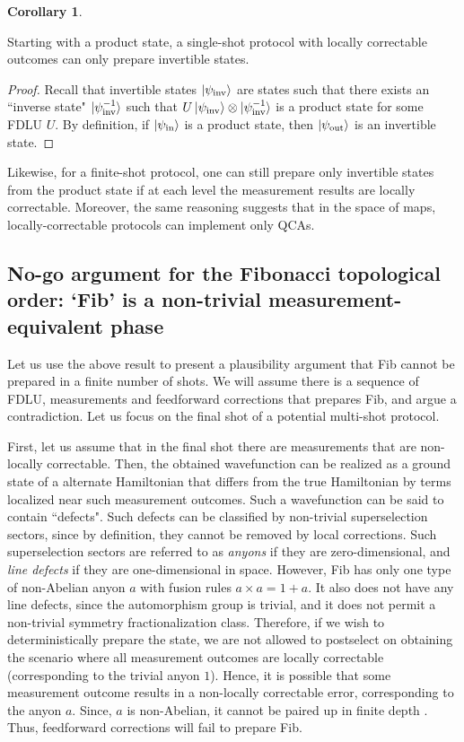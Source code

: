 \documentclass[nofootinbib,prx,twocolumn,showpacs,superscriptaddress,notitlepage,amsmath,amssymb]{revtex4-2}
\theoremstyle{definition}
\def\ket#1{\mathinner{|{#1}\rangle}}
\newtheorem{cor}[theorem]{Corollary}
\begin{document}
\begin{cor}
\begin{shaded}
Starting with a product state, a single-shot protocol with locally correctable outcomes can only prepare invertible states. 
\label{thm:cor3}
\end{shaded}
\begin{proof}
    Recall that invertible states $\ket{\psi_\text{inv}}$ are states such that there exists an ``inverse state" $\ket{\psi_\text{inv}^{-1}}$ such that $U \ket{\psi_\text{inv}} \otimes \ket{\psi_\text{inv}^{-1}} $ is a product state for some FDLU $U$. By definition, if $\ket{\psi_\text{in}}$ is a product state, then $\ket{\psi_\text{out}}$ is an invertible state.
\end{proof}
\end{cor}
Likewise, for a finite-shot protocol, one can still prepare only invertible states from the product state if at each level the measurement results are locally correctable. Moreover, the same reasoning suggests that in the space of maps, locally-correctable protocols can implement only QCAs.

\subsection{No-go argument for the Fibonacci topological order: `Fib' is a non-trivial measurement-equivalent phase}

Let us use the above result to present a plausibility argument that Fib cannot be prepared in a finite number of shots. We will assume there is a sequence of FDLU, measurements and feedforward corrections that prepares Fib, and argue a contradiction. Let us focus on the final shot of a potential multi-shot protocol.

First, let us assume that in the final shot there are measurements that are non-locally correctable. Then, the obtained wavefunction can be realized as a ground state of a alternate Hamiltonian that differs from the true Hamiltonian by terms localized near such measurement outcomes. Such a wavefunction can be said to contain ``defects". Such defects can be classified by non-trivial superselection sectors, since by definition, they cannot be removed by local corrections. Such superselection sectors are referred to as \textit{anyons} if they are zero-dimensional, and \textit{line defects} if they are one-dimensional in space. However, Fib has only one type of non-Abelian anyon $a$ with fusion rules $a\times a = 1+ a$. It also does not have any line defects, since the automorphism group is trivial, and it does not permit a non-trivial symmetry fractionalization class. Therefore, if we wish to deterministically prepare the state, we are not allowed to postselect on obtaining the scenario where all measurement outcomes are locally correctable (corresponding to the trivial anyon $1$). Hence, it is possible that some measurement outcome results in a non-locally correctable error, corresponding to the anyon $a$. Since, $a$ is non-Abelian, it cannot be paired up in finite depth \cite{Shi19,Liu21,Bravyi22}. Thus, feedforward corrections will fail to prepare Fib.
\end{document}
